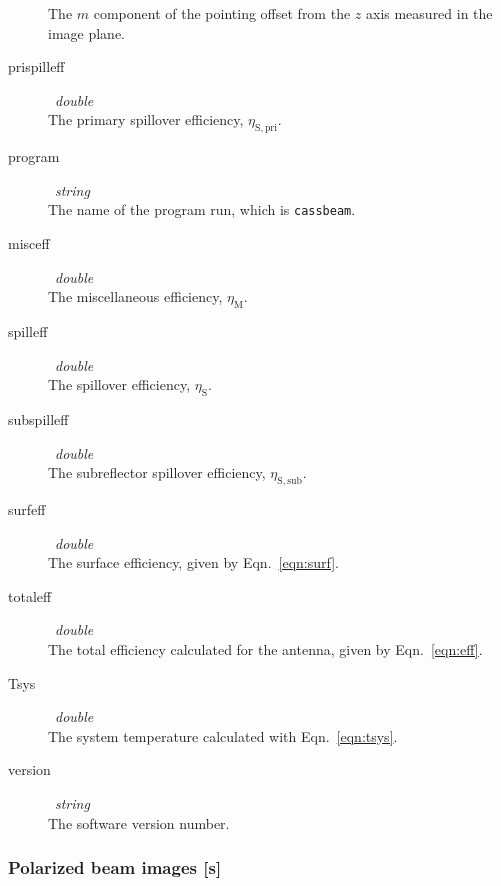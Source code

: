 \documentclass{article}
\begin{document}
\begin{description}
The $m$ component of the pointing offset from the $z$ axis 
measured in the image plane.
\item[prispilleff] \ {\it double} \\
The primary spillover efficiency, $\eta_\mathrm{S,pri}$.
\item[program] \ {\it string} \\
The name of the program run, which is {\tt cassbeam}.
\item[misceff] \ {\it double} \\
The miscellaneous efficiency, $\eta_\mathrm{M}$.
\item[spilleff] \ {\it double} \\
The spillover efficiency, $\eta_\mathrm{S}$.
\item[subspilleff] \ {\it double} \\
The subreflector spillover efficiency, $\eta_\mathrm{S,sub}$.
\item[surfeff] \ {\it double} \\
The surface efficiency, given by Eqn.~\ref{eqn:surf}.
\item[totaleff] \ {\it double} \\
The total efficiency calculated for the antenna, given by 
Eqn.~\ref{eqn:eff}.
\item[Tsys] \ {\it double} \\
The system temperature calculated with Eqn.~\ref{eqn:tsys}.
\item[version] \ {\it string} \\
The software version number.
\end{description}

\subsubsection{Polarized beam images [{\bf s}]}
\end{document}
